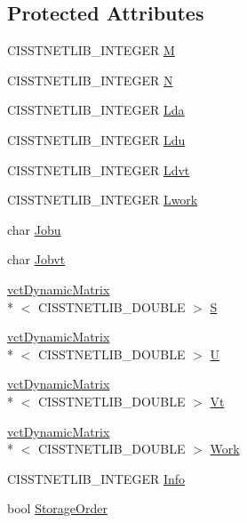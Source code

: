 \subsection*{Protected Attributes}
\begin{DoxyCompactItemize}
\item 
C\-I\-S\-S\-T\-N\-E\-T\-L\-I\-B\-\_\-\-I\-N\-T\-E\-G\-E\-R \hyperlink{classnmr_s_v_d_solver_af16aa65c812236c80f9173748db22acb}{M}
\item 
C\-I\-S\-S\-T\-N\-E\-T\-L\-I\-B\-\_\-\-I\-N\-T\-E\-G\-E\-R \hyperlink{classnmr_s_v_d_solver_aef8ac12080959a681276af72da1bef93}{N}
\item 
C\-I\-S\-S\-T\-N\-E\-T\-L\-I\-B\-\_\-\-I\-N\-T\-E\-G\-E\-R \hyperlink{classnmr_s_v_d_solver_a3811b3b186d6b171c73bb905310e638c}{Lda}
\item 
C\-I\-S\-S\-T\-N\-E\-T\-L\-I\-B\-\_\-\-I\-N\-T\-E\-G\-E\-R \hyperlink{classnmr_s_v_d_solver_aaa2c1ed67903ff66be23a17cd3c3af90}{Ldu}
\item 
C\-I\-S\-S\-T\-N\-E\-T\-L\-I\-B\-\_\-\-I\-N\-T\-E\-G\-E\-R \hyperlink{classnmr_s_v_d_solver_a440639f824e2e44e990760c468e30553}{Ldvt}
\item 
C\-I\-S\-S\-T\-N\-E\-T\-L\-I\-B\-\_\-\-I\-N\-T\-E\-G\-E\-R \hyperlink{classnmr_s_v_d_solver_a99ff6eb1d7fc8ecc1ac950afcc5c90dc}{Lwork}
\item 
char \hyperlink{classnmr_s_v_d_solver_aa1cd31744f3929582fb5de43be96d3e9}{Jobu}
\item 
char \hyperlink{classnmr_s_v_d_solver_ac3ca9ed1369ecb4fcc73ccdb8f443029}{Jobvt}
\item 
\hyperlink{classvct_dynamic_matrix}{vct\-Dynamic\-Matrix}\\*
$<$ C\-I\-S\-S\-T\-N\-E\-T\-L\-I\-B\-\_\-\-D\-O\-U\-B\-L\-E $>$ \hyperlink{classnmr_s_v_d_solver_aca07b1c1cace20d92b7d491341bfb9fe}{S}
\item 
\hyperlink{classvct_dynamic_matrix}{vct\-Dynamic\-Matrix}\\*
$<$ C\-I\-S\-S\-T\-N\-E\-T\-L\-I\-B\-\_\-\-D\-O\-U\-B\-L\-E $>$ \hyperlink{classnmr_s_v_d_solver_acc19b0a389707d8cc7c592bbce894b61}{U}
\item 
\hyperlink{classvct_dynamic_matrix}{vct\-Dynamic\-Matrix}\\*
$<$ C\-I\-S\-S\-T\-N\-E\-T\-L\-I\-B\-\_\-\-D\-O\-U\-B\-L\-E $>$ \hyperlink{classnmr_s_v_d_solver_a095a57197ba4c316b6761b25547b38f0}{Vt}
\item 
\hyperlink{classvct_dynamic_matrix}{vct\-Dynamic\-Matrix}\\*
$<$ C\-I\-S\-S\-T\-N\-E\-T\-L\-I\-B\-\_\-\-D\-O\-U\-B\-L\-E $>$ \hyperlink{classnmr_s_v_d_solver_af78f509d3f0c674618f1d40c07c7fdc0}{Work}
\item 
C\-I\-S\-S\-T\-N\-E\-T\-L\-I\-B\-\_\-\-I\-N\-T\-E\-G\-E\-R \hyperlink{classnmr_s_v_d_solver_a31d09d7a13b8917259c42edb13f6198a}{Info}
\item 
bool \hyperlink{classnmr_s_v_d_solver_a9588844c42329b2d4224d397eebaab5c}{Storage\-Order}
\end{DoxyCompactItemize}


